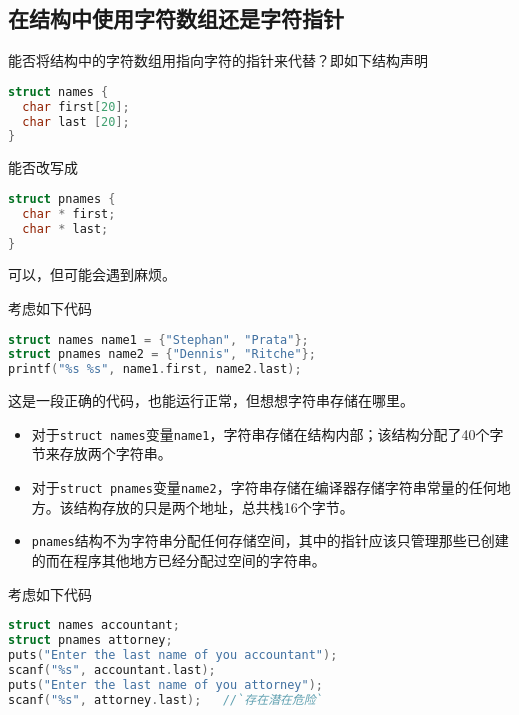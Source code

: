 \subsection{在结构中使用字符数组还是字符指针}
\begin{frame}[fragile]\ft{\subsecname}
\begin{wenti}
能否将结构中的字符数组用指向字符的指针来代替？即如下结构声明
\begin{lstlisting}[language=c,backgroundcolor=\color{red!20}]
struct names {
  char first[20];
  char last [20];
}
\end{lstlisting}
能否改写成
\begin{lstlisting}[language=c,backgroundcolor=\color{red!20}]
struct pnames {
  char * first;
  char * last;
}
\end{lstlisting}
\end{wenti} \pause 
{\Large 可以}，但可能会遇到麻烦。
\end{frame}

\begin{frame}[fragile]\ft{\subsecname}
考虑如下代码
\begin{lstlisting}[language=c,backgroundcolor=\color{red!20}]
struct names name1 = {"Stephan", "Prata"};
struct pnames name2 = {"Dennis", "Ritche"};
printf("%s %s", name1.first, name2.last);
\end{lstlisting}
这是一段正确的代码，也能运行正常，但想想字符串存储在哪里。
\end{frame}

\begin{frame}[fragile]\ft{\subsecname}
\begin{itemize}
\item 对于\verb|struct names|变量\verb|name1|，字符串存储在结构内部；该结构分配了40个字节来存放两个字符串。\\[0.1in]
\item 对于\verb|struct pnames|变量\verb|name2|，字符串存储在编译器存储字符串常量的任何地方。该结构存放的只是两个地址，总共栈16个字节。\\[0.1in]
\item[]
 \verb|pnames|结构不为字符串分配任何存储空间，其中的指针应该只管理那些已创建的而在程序其他地方已经分配过空间的字符串。
\end{itemize}
\end{frame}

\begin{frame}[fragile]\ft{\subsecname}
考虑如下代码
\begin{lstlisting}[language=c,backgroundcolor=\color{red!20}]
struct names accountant;
struct pnames attorney;
puts("Enter the last name of you accountant");
scanf("%s", accountant.last);
puts("Enter the last name of you attorney");
scanf("%s", attorney.last);   //`存在潜在危险`
\end{lstlisting}
\end{frame}

